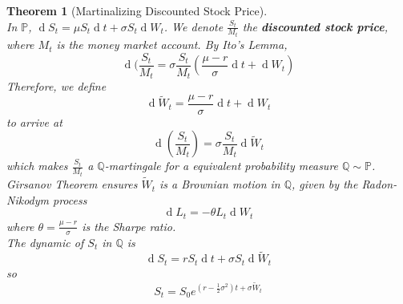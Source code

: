 \documentclass[12pt]{article}
\newtheorem{theorem}{Theorem}[section]
\theoremstyle{definition}
\DeclareMathOperator{\diff}{d}
\begin{document}
\begin{theorem}[Martinalizing Discounted Stock Price]
\hfill\\\normalfont In $\mathbb{P}$, $\diff S_t = \mu S_t\diff t + \sigma S_t\diff W_t$. We denote $\frac{S_t}{M_t}$ the \textbf{discounted stock price}, where $M_t$ is the money market account. By Ito's Lemma,
\[
\diff(\frac{S_t}{M_t}=\sigma\frac{S_t}{M_t}(\frac{\mu-r}{\sigma}\diff t + \diff W_t)
\]
Therefore, we define
\[
\diff \tilde{W}_t=\frac{\mu-r}{\sigma}\diff t+\diff W_t
\]
to arrive at 
\[
\diff (\frac{S_t}{M_t})=\sigma\frac{S_t}{M_t}\diff \tilde{W}_t
\]
which makes $\frac{S_t}{M_t}$ a $\mathbb{Q}$-martingale for a equivalent probability measure $\mathbb{Q}\sim \mathbb{P}$.\\
Girsanov Theorem ensures $\tilde{W}_t$ is a Brownian motion in $\mathbb{Q}$, given by the Radon-Nikodym process
\[
\diff L_t = -\theta L_t\diff W_t
\]
where $\theta=\frac{\mu-r}{\sigma}$ is the Sharpe ratio.\\
The dynamic of $S_t$ in $\mathbb{Q}$ is
\[
\diff S_t = rS_t\diff t +\sigma S_t\diff \tilde{W}_t
\]
so
\[
S_t=S_0e^{(r-\frac{1}{2}\sigma^2)t+\sigma\tilde{W}_t}
\]
\end{theorem}
\end{document}
